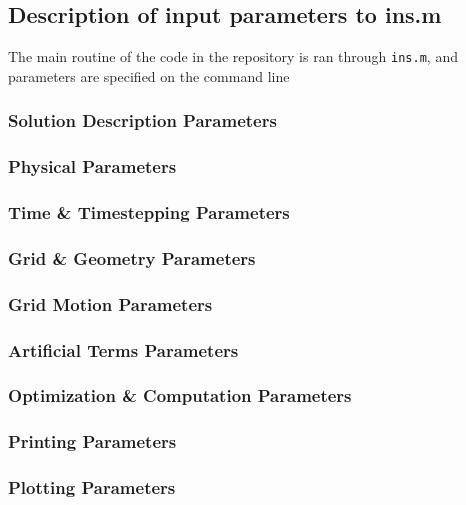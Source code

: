 \subsection{Description of input parameters to ins.m}
  
The main routine of the code in the repository is ran through \verb|ins.m|, and parameters are specified on the command line

\subsubsection{Solution Description Parameters}

\subsubsection{Physical Parameters}

\subsubsection{Time \& Timestepping Parameters}

\subsubsection{Grid \& Geometry Parameters}

\subsubsection{Grid Motion Parameters}

\subsubsection{Artificial Terms Parameters}

\subsubsection{Optimization \& Computation Parameters}

\subsubsection{Printing Parameters}

\subsubsection{Plotting Parameters}
